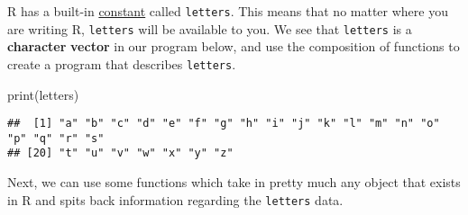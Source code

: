\documentclass[
]{book}
\newenvironment{Shaded}{\begin{snugshade}}{\end{snugshade}}
\newcommand{\FunctionTok}[1]{\textcolor[rgb]{0.00,0.00,0.00}{#1}}
\newcommand{\NormalTok}[1]{#1}
\begin{document}
R has a built-in \href{https://stat.ethz.ch/R-manual/R-devel/library/base/html/Constants.html}{constant} called \texttt{letters}. This means that no matter where you are writing R, \texttt{letters} will be available to you. We see that \texttt{letters} is a \textbf{character} \textbf{vector} in our program below, and use the composition of functions to create a program that describes \texttt{letters}.

\begin{Shaded}
\begin{Highlighting}[]
\FunctionTok{print}\NormalTok{(letters)}
\end{Highlighting}
\end{Shaded}

\begin{verbatim}
##  [1] "a" "b" "c" "d" "e" "f" "g" "h" "i" "j" "k" "l" "m" "n" "o" "p" "q" "r" "s"
## [20] "t" "u" "v" "w" "x" "y" "z"
\end{verbatim}

Next, we can use some functions which take in pretty much any object that exists in R and spits back information regarding the \texttt{letters} data.
\end{document}
